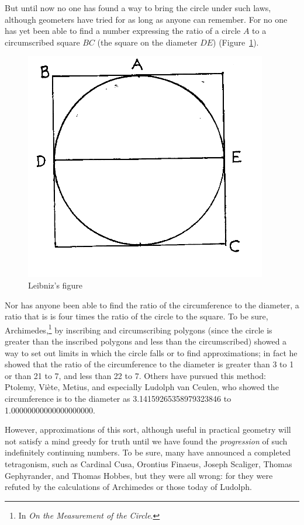 \documentclass[twoside,openright]{article}
\begin{document}
But until now no one has found a way to bring the circle under such
laws, although geometers have tried for as long as anyone can
remember.  For no one has yet been able to find a number expressing
the ratio of a circle $A$ to a circumscribed square $BC$ (the square
on the diameter $DE$) (Figure~\ref{inscrcirc}).
\begin{figure}[htp]
  \begin{center}
    \includegraphics[width=.4\textwidth]{fig/Figure58}
    \caption{Leibniz's figure}
    \label{inscrcirc}
  \end{center}
\end{figure} Nor has anyone been able to find the ratio of the
circumference to the diameter, a ratio that is is four times the ratio
of the circle to the square.  To be sure, Archimedes,\footnote{In {\em
    On the Measurement of the Circle}.} by inscribing and
circumscribing polygons (since the circle is greater than the
inscribed polygons and less than the circumscribed) showed a way to
set out limits in which the circle falls or to find approximations; in
fact he showed that the ratio of the circumference to the diameter is
greater than 3 to 1 or than 21 to 7, and less than 22 to 7.  Others
have pursued this method: Ptolemy, Vi\`{e}te, Metius, and especially
Ludolph van Ceulen, who showed the circumference is to the diameter as
3.14159265358979323846 to 1.00000000000000000000.

However, approximations of this sort, although useful in practical
geometry will not satisfy a mind greedy for truth until we have found
the {\em progression} of such indefinitely continuing numbers.  To be
sure, many have announced a completed tetragonism, such as Cardinal
Cusa, Orontius Finaeus, Joseph Scaliger, Thomas Gephyrander, and
Thomas Hobbes, but they were all wrong: for they were refuted by the
calculations of Archimedes or those today of Ludolph.
\end{document}

